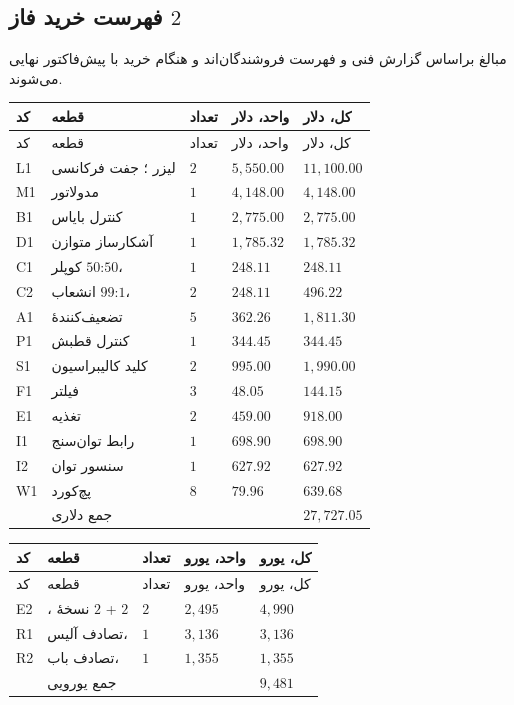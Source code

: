 \subsection{فهرست خرید فاز $2$}
\label{sub:p2buy}
مبالغ براساس گزارش فنی  و فهرست فروشندگان‌اند و هنگام خرید با پیش‌فاکتور نهایی می‌شوند.

\begin{longtable}{C{0.8cm}R{7.1cm}C{0.8cm}C{2.2cm}C{2.2cm}}
\toprule {} کد & قطعه & تعداد & واحد، دلار & کل، دلار \\ \midrule
\endfirsthead
\toprule {} کد & قطعه & تعداد & واحد، دلار & کل، دلار \\ \midrule
\endhead
L1 & لیزر ؛ جفت فرکانسی & $2$ & $5{,}550.00$ & $11{,}100.00$ \\
M1 & مدولاتور  & $1$ & $4{,}148.00$ & $4{,}148.00$ \\
B1 & کنترل بایاس  & $1$ & $2{,}775.00$ & $2{,}775.00$ \\
D1 & آشکارساز متوازن  & $1$ & $1{,}785.32$ & $1{,}785.32$ \\
C1 & کوپلر $50$:$50$،  & $1$ & $248.11$ & $248.11$ \\
C2 & انشعاب $99$:$1$،  & $2$ & $248.11$ & $496.22$ \\
A1 & تضعیف‌کنندهٔ  & $5$ & $362.26$ & $1{,}811.30$ \\
P1 & کنترل قطبش  & $1$ & $344.45$ & $344.45$ \\
S1 & کلید کالیبراسیون  & $2$ & $995.00$ & $1{,}990.00$ \\
F1 & فیلتر  & $3$ & $48.05$ & $144.15$ \\
E1 & تغذیه  & $2$ & $459.00$ & $918.00$ \\
I1 & رابط توان‌سنج  & $1$ & $698.90$ & $698.90$ \\
I2 & سنسور توان  & $1$ & $627.92$ & $627.92$ \\
W1 & پچ‌کورد  & $8$ & $79.96$ & $639.68$ \\
\midrule & جمع دلاری &  &  & $27{,}727.05$ \\
\bottomrule\end{longtable}

\begin{longtable}{C{0.8cm}R{7.3cm}C{0.8cm}C{2.1cm}C{2.1cm}}
\toprule {} کد & قطعه & تعداد & واحد، یورو & کل، یورو \\ \midrule
\endfirsthead
\toprule {} کد & قطعه & تعداد & واحد، یورو & کل، یورو \\ \midrule
\endhead
E2 & ، نسخهٔ $2$  + $2$  & $2$ & $2{,}495$ & $4{,}990$ \\
R1 & تصادف آلیس،  & $1$ & $3{,}136$ & $3{,}136$ \\
R2 & تصادف باب،  & $1$ & $1{,}355$ & $1{,}355$ \\
\midrule & جمع یورویی &  &  & $9{,}481$ \\
\bottomrule\end{longtable}

